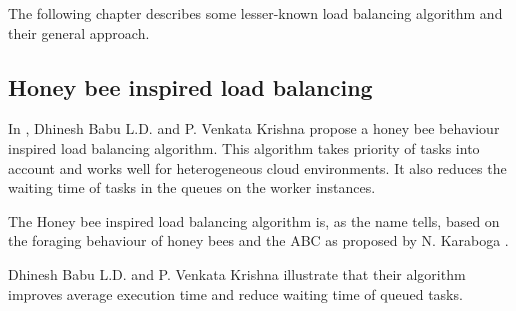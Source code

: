The following chapter describes some lesser-known load balancing algorithm and
their general approach.

\subsection{Honey bee inspired load balancing}

In \cite{honeybee}, Dhinesh Babu L.D. and P. Venkata Krishna propose a honey bee
behaviour inspired load balancing algorithm.
This algorithm takes priority of tasks into account and works well for
heterogeneous cloud environments.
It also reduces the waiting time of tasks in the queues on the worker instances.

The Honey bee inspired load balancing algorithm is, as the name tells, based on
the foraging behaviour of honey bees and the \ac{ABC} as proposed by
N. Karaboga \cite{honeybee}.

Dhinesh Babu L.D. and P. Venkata Krishna illustrate that their algorithm
improves average execution time and reduce waiting time of queued tasks.

